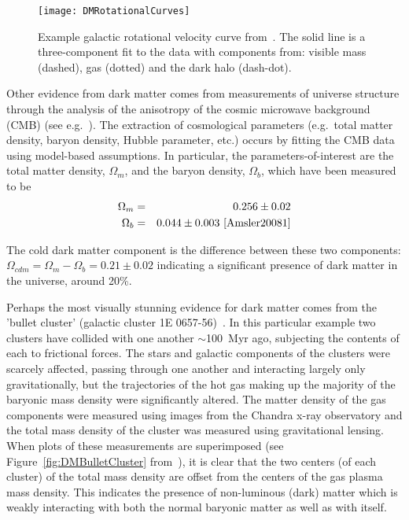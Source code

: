 		\begin{figure}
			\centering
			\texttt{[image: DMRotationalCurves]}
			\caption[Example galactic rotational velocity curve.]{Example galactic rotational velocity curve 
			from~\cite{Begeman:1991iy}.  The solid line is a three-component fit to the data with components from:
			visible mass (dashed), gas (dotted) and the dark halo (dash-dot).  }
			\label{fig:DMRotCurve}
		\end{figure}
	Other evidence from dark matter comes from measurements of universe structure through the analysis of the anisotropy of the cosmic microwave background (CMB) (see e.g.~\cite{Amsler20081}).  The extraction of cosmological parameters (e.g.~total matter density, baryon density, Hubble parameter, etc.) occurs by fitting the CMB data using model-based assumptions.  In particular, the parameters-of-interest are the total matter density, $\Omega_{m}$, and the baryon density, $\Omega_{b}$, which have been measured to be
		\begin{eqnarray*}
			\Omega_{m} & = & 0.256 \pm 0.02 \\
			\Omega_{b} & = & 0.044 \pm 0.003~\cite{Amsler20081}
		\end{eqnarray*}

The cold dark matter component is the difference between these two components: $\Omega_{cdm} = \Omega_{m} - \Omega_{b} = 0.21 \pm 0.02$ indicating a significant presence of dark matter in the universe, around 20\%.

	
	Perhaps the most visually stunning evidence for dark matter comes from the 'bullet cluster' (galactic cluster 1E 0657-56)~\cite{Clowe06}.  In this particular example two clusters have collided with one another $\sim$100~Myr ago, subjecting the contents of each to frictional forces.  The stars and galactic components of the clusters were scarcely affected, passing through one another and interacting largely only gravitationally, but the trajectories of the hot gas making up the majority of the baryonic mass density were significantly altered.  The matter density of the gas components were measured using images from the Chandra x-ray observatory and the total mass density of the cluster was measured using gravitational lensing.  When plots of these measurements are superimposed (see Figure~\ref{fig:DMBulletCluster} from~\cite{Clowe06}), it is clear that the two centers (of each cluster) of the total mass density are offset from the centers of the gas plasma mass density.  This indicates the presence of non-luminous (dark) matter which is weakly interacting with both the normal baryonic matter as well as with itself.
	

